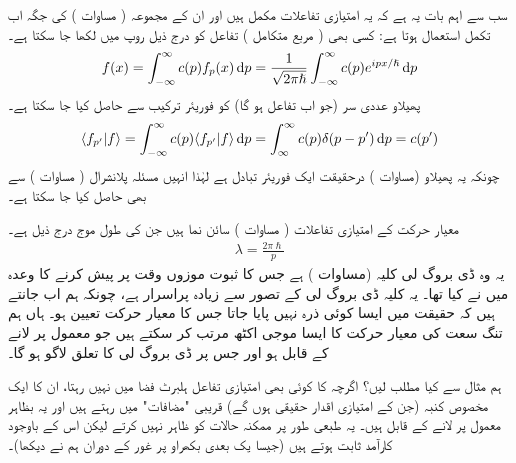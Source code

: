 سب سے اہم بات یہ ہے کہ یہ امتیازی تفاعلات مکمل ہیں اور ان کے مجموعہ ( مساوات ) کی جگہ اب تکمل استعمال ہوتا ہے: کسی بھی ( مربع  متکامل ) تفاعل  کو درج ذیل روپ میں لکھا جا سکتا ہے۔
\begin{align}\label{مساوات_قواعد_تفاعل_بطور_فوریئر_تکمل}
f(x) = \int_{-\infty}^{\infty} c(p)f_{p}(x)\dif p = \frac{1}{\sqrt{2\pi\hslash}}\int_{-\infty}^{\infty}c(p)e^{ipx/\hslash}\dif p
\end{align}
پھیلاو عددی سر (جو اب تفاعل  ہو گا) کو فوریئر ترکیب سے حاصل کیا جا سکتا ہے۔
\begin{align}
\langle f_{p'} | f \rangle = \int_{-\infty}^{\infty} c(p) \langle f_{p'} | f \rangle \dif p = \int_{\infty}^{\infty}c(p)\delta (p-p') \dif p = c(p')
\end{align}
چونکہ یہ پھیلاو (مساوات ) درحقیقت ایک فوریئر تبادل ہے لہٰذا انہیں مسئلہ پلانشرال ( مساوات ) سے بھی حاصل کیا جا سکتا ہے۔ 

معیار حرکت کے امتیازی تفاعلات ( مساوات ) سائن نما ہیں جن کی طول موج درج ذیل ہے۔
\begin{align}
\lambda = \frac{2\pi\hslash}{p} 
\end{align}
یہ وہ ڈی بروگ لی کلیہ (مساوات ) ہے جس کا ثبوت موزوں وقت پر پیش کرنے کا وعدہ میں نے کیا تھا۔ یہ کلیہ ڈی بروگ لی کے تصور سے زیادہ پراسرار ہے، چونکہ ہم اب جانتے ہیں کہ حقیقت میں ایسا کوئی ذرہ نہیں پایا جاتا جس کا معیار حرکت تعیین ہو۔ ہاں ہم تنگ سعت کی معیار حرکت کا ایسا موجی اکٹھ مرتب کر  سکتے ہیں جو معمول پر لانے کے قابل ہو اور جس پر ڈی بروگ لی کا تعلق لاگو ہو گا۔

ہم مثال  سے کیا مطلب لیں؟ اگرچہ  کا کوئی بھی امتیازی تفاعل ہلبرٹ فضا میں نہیں رہتا، ان کا ایک مخصوص کنبہ (جن کے امتیازی اقدار حقیقی ہوں گے) قریبی "مضافات" میں رہتے ہیں اور یہ بظاہر معمول پر لانے کے قابل ہیں۔ یہ طبعی طور پر ممکنہ حالات کو ظاہر نہیں کرتے لیکن اس کے باوجود کارآمد ثابت ہوتے ہیں (جیسا یک بعدی بکھراو پر غور کے دوران ہم نے دیکھا)۔



